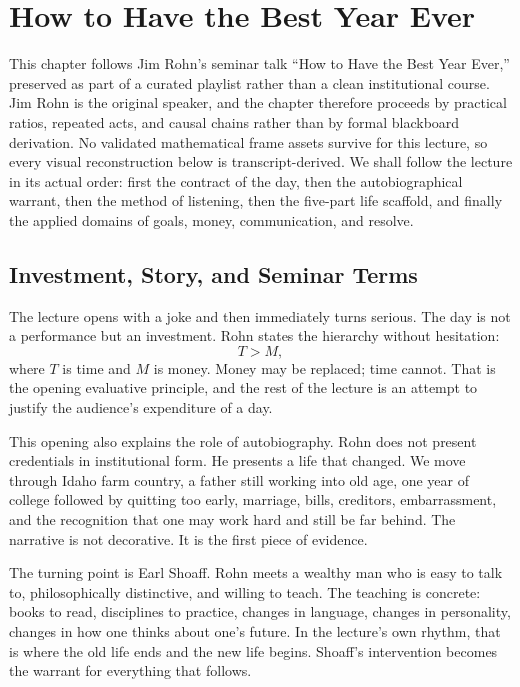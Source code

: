 \chapter{How to Have the Best Year Ever}

This chapter follows Jim Rohn's seminar talk ``How to Have the Best Year Ever,'' preserved as part of a curated playlist rather than a clean institutional course. Jim Rohn is the original speaker, and the chapter therefore proceeds by practical ratios, repeated acts, and causal chains rather than by formal blackboard derivation. No validated mathematical frame assets survive for this lecture, so every visual reconstruction below is transcript-derived. We shall follow the lecture in its actual order: first the contract of the day, then the autobiographical warrant, then the method of listening, then the five-part life scaffold, and finally the applied domains of goals, money, communication, and resolve.

\section{Investment, Story, and Seminar Terms}

The lecture opens with a joke and then immediately turns serious. The day is not a performance but an investment. Rohn states the hierarchy without hesitation:
\begin{equation}
T > M,
\end{equation}
where \(T\) is time and \(M\) is money. Money may be replaced; time cannot. That is the opening evaluative principle, and the rest of the lecture is an attempt to justify the audience's expenditure of a day.

This opening also explains the role of autobiography. Rohn does not present credentials in institutional form. He presents a life that changed. We move through Idaho farm country, a father still working into old age, one year of college followed by quitting too early, marriage, bills, creditors, embarrassment, and the recognition that one may work hard and still be far behind. The narrative is not decorative. It is the first piece of evidence.

The turning point is Earl Shoaff. Rohn meets a wealthy man who is easy to talk to, philosophically distinctive, and willing to teach. The teaching is concrete: books to read, disciplines to practice, changes in language, changes in personality, changes in how one thinks about one's future. In the lecture's own rhythm, that is where the old life ends and the new life begins. Shoaff's intervention becomes the warrant for everything that follows.

